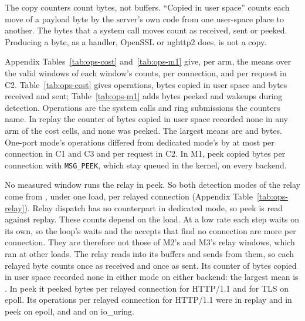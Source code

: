The copy counters count bytes, not buffers. ``Copied in user space'' counts each move of a payload
byte by the server's own code from one user-space place to another. The bytes that a system call
moves count as received, sent or peeked. Producing a byte, as a handler, OpenSSL or nghttp2 does,
is not a copy.

 Appendix Tables~\ref{tab:ops-cost} and~\ref{tab:ops-m1}
give, per arm, the means over the valid windows of each window's counts, per connection, and per
request in C2. Table~\ref{tab:ops-cost} gives operations, bytes copied in user space and bytes
received and sent; Table~\ref{tab:ops-m1} adds bytes peeked and wakeups during detection.
Operations are the system calls and ring submissions the counters name. In replay the counter of
bytes copied in user space recorded none in any arm of the \WlFiveCostCells{} cost cells, and none
was peeked. The largest means are \WlFiveCostCopiedMax{} and \WlFiveCostPeekedMax{} bytes. One-port
mode's operations differed from dedicated mode's by at most \WlFiveCostOpsMaxDiffConn{} per
connection in C1 and C3 and \WlFiveCostOpsMaxDiffReq{} per request in C2. In M1, peek copied
\WlFiveMOneLEpollHttpPeekPeeked{} bytes per connection with \texttt{MSG\_PEEK}, which stay queued in
the kernel, on every backend.

 No measured window runs the relay in peek. So both detection
modes of the relay come from \JobSt, under one load, per relayed connection (Appendix
Table~\ref{tab:ops-relay}). Relay dispatch has no counterpart in dedicated mode, so peek is read
against replay. These counts depend on the load. At a low rate each step waits on its own, so the
loop's waits and the accepts that find no connection are more per connection. They are
therefore not those of M2's and M3's relay windows, which ran at other loads. The relay reads into its buffers and sends from them, so each relayed byte
counts once as received and once as sent. Its counter of bytes copied in user space recorded none
in either mode on either backend: the largest mean is \TraceRelayCopiedMax. In peek it peeked
\TraceRelayEpollHttpPeekPeeked{} bytes per relayed connection for HTTP/1.1 and
\TraceRelayEpollTlsSniPeekPeeked{} for TLS on epoll. Its operations per relayed connection for
HTTP/1.1 were \TraceRelayEpollHttpReplayOps{} in replay and \TraceRelayEpollHttpPeekOps{} in peek on
epoll, and \TraceRelayIouringHttpReplayOps{} and \TraceRelayIouringHttpPeekOps{} on io\_uring.

